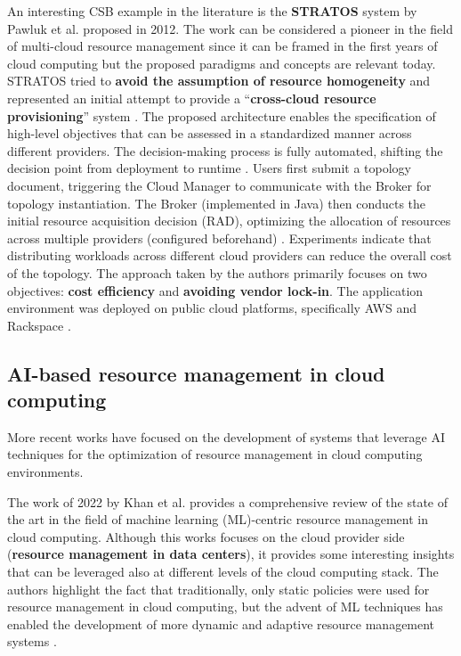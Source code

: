 An interesting CSB example in the literature is the \textbf{STRATOS} system by Pawluk et al. proposed in 2012. The work can be considered a pioneer in the field of multi-cloud resource management since it can be framed in the first years of cloud computing \cite{STRATOS} but the proposed paradigms and concepts are relevant today.
STRATOS tried to \textbf{avoid the assumption of resource homogeneity} and represented an initial attempt to provide a ``\textbf{cross-cloud resource provisioning}'' system \cite{STRATOS}.
The proposed architecture enables the specification of high-level objectives that can be assessed in a standardized manner across different providers. The decision-making process is fully automated, shifting the decision point from deployment to runtime \cite{STRATOS}.
Users first submit a topology document, triggering the Cloud Manager to communicate with the Broker for topology instantiation. The Broker (implemented in Java) then conducts the initial resource acquisition decision (RAD), optimizing the allocation of resources across multiple providers (configured beforehand) \cite{STRATOS}.
Experiments indicate that distributing workloads across different cloud providers can reduce the overall cost of the topology. The approach taken by the authors primarily focuses on two objectives: \textbf{cost efficiency} and \textbf{avoiding vendor lock-in}. The application environment was deployed on public cloud platforms, specifically AWS and Rackspace \cite{STRATOS}.

\subsection{AI-based resource management in cloud computing}
\label{sec:ai_based_resource_management}

More recent works have focused on the development of systems that leverage AI techniques for the optimization of resource management in cloud computing environments.

The work of 2022 by Khan et al. \cite{KHAN2022103405} provides a comprehensive review of the state of the art in the field of machine learning (ML)-centric resource management in cloud computing.
Although this works focuses on the cloud provider side (\textbf{resource management in data centers}), it provides some interesting insights that can be leveraged also at different levels of the cloud computing stack.
The authors highlight the fact that traditionally, only static policies were used for resource management in cloud computing, but the advent of ML techniques has enabled the development of more dynamic and adaptive resource management systems \cite{KHAN2022103405}. \newline

